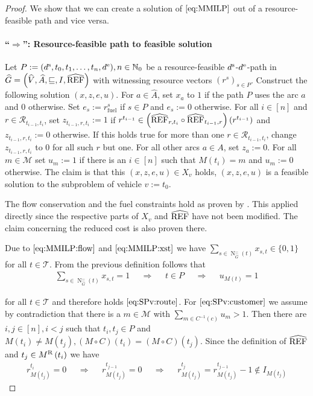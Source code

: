 \begin{proof}

We show that we can create a solution of $\eqref{eq:MMILP}$ out of a resource-feasible path and vice versa.

\paragraph{\enquote{$\boldsymbol{\Rightarrow}$}: Resource-feasible path to feasible solution} \proofparfill

Let ${P:=\left(d^{\operatorname{s}},t_0,t_1,\dots,t_n,d^{\operatorname{e}}\right)}, {n\in\mathbb{N}_0}$ be a resource-feasible $d^{\operatorname{s}}$-$d^{\operatorname{e}}$-path in ${\widehat{G}=\left(\widehat{V},\widehat{A},\sqsubseteq,I,\widehat{\operatorname{REF}}\right)}$ with witnessing resource vectors $\left(r^s\right)_{s\in P}$. Construct the following solution $(x,z,e,u)$. For $a\in\widehat{A}$, set $x_a$ to $1$ if the path $P$ uses the arc $a$ and $0$ otherwise. Set ${e_s := r^s_{\operatorname{fuel}}}$ if $s\in P$ and $e_s:=0$ otherwise. For all $i\in[n]$ and $r\in\mathcal{R}_{t_{i-1},t_i}$, set ${z_{t_{i-1},r,t_i} := 1}$ if ${r^{t_{i-1}}\in\left(\widehat{\operatorname{REF}}_{r,t_i}\circ\widehat{\operatorname{REF}}_{t_{i-1},r}\right)\left(r^{t_{i-1}}\right)}$ and ${z_{t_{i-1},r,t_i} := 0}$ otherwise. If this holds true for more than one ${r\in\mathcal{R}_{t_{i-1},t_i}}$, change $z_{t_{i-1},r,t_i}$ to $0$ for all such $r$ but one. For all other arcs $a\in A$, set $z_a:=0$. For all $m\in\mathcal{M}$ set ${u_m := 1}$ if there is an ${i\in[n]}$ such that ${M\left(t_i\right)=m}$ and ${u_m := 0}$ otherwise. The claim is that this $(x,z,e,u)\in X_v$ holds, \ie $(x,z,e,u)$ is a feasible solution to the subproblem of vehicle $v:=t_0$.

The flow conservation and the fuel constraints hold as proven by \cite{Kaiser}. This applied directly since the respective parts of $X_v$ and $\widehat{\operatorname{REF}}$ have not been modified. The claim concerning the reduced cost is also proven there.

Due to $\eqref{eq:MMILP:flow}$ and $\eqref{eq:MMILP:xst}$ we have ${\sum_{s\in\operatorname{N}^-_{\widehat{G}}(t)} x_{s,t} \in\{0,1\}}$ for all $t\in\mathcal{T}$. From the previous definition follows that
\begin{align*}
	\sum_{s\in\operatorname{N}^-_{\widehat{G}}(t)} x_{s,t} = 1 && \Rightarrow && t\in P && \Rightarrow && u_{M(t)} = 1
\end{align*}

for all $t\in\mathcal{T}$ and therefore holds $\eqref{eq:SPv:route}$. For $\eqref{eq:SPv:customer}$ we assume by contradiction that there is a $m\in\mathcal{M}$ with ${\sum_{m\in C^{-1}(c)} u_m > 1}$. Then there are ${i,j\in[n]}, {i<j}$ such that ${t_i,t_j\in P}$ and ${M\left(t_i\right)\neq M\left(t_j\right)}, {(M\circ C)\left(t_i\right) = (M\circ C)\left(t_j\right)}$. Since the definition of $\widehat{\operatorname{REF}}$ and ${t_j\in M^{\operatorname{R}}\left(t_i\right)}$ we have
\begin{align*}
	r^{t_i}_{M\left(t_j\right)}=0 && \Rightarrow && r^{t_{j-1}}_{M\left(t_j\right)} = 0 && \Rightarrow && r^{t_j}_{M\left(t_j\right)} = r^{t_{j-1}}_{M\left(t_j\right)} - 1 \notin I_{M\left(t_j\right)}
\end{align*}


\end{proof}
